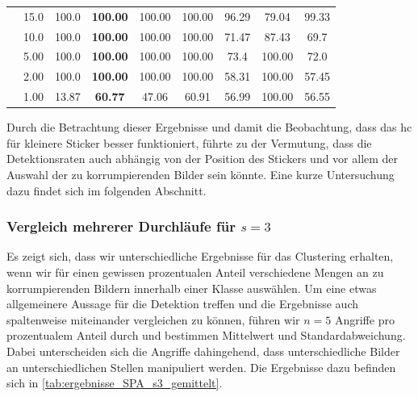 \documentclass[twoside, 12pt,a4paper]{book}
\numberwithin{equation}{section}
\begin{document}
\begin{table}[ht!]
\begin{center}
{\begin{tabular}{|l|c|c|ccc|ccc|}
				& 15.0			& 100.0		& \textbf{100.00}& 100.00	& 100.00& 96.29	& 79.04	& 99.33	 \\
				& 10.0			& 100.0		& \textbf{100.00}& 100.00	& 100.00& 71.47	& 87.43 & 69.7 	 \\
				& 5.00			& 100.0		& \textbf{100.00}& 100.00	& 100.00& 73.4	& 100.00& 72.0	\\
				& 2.00			& 100.0		& \textbf{100.00}& 100.00	& 100.00& 58.31 & 100.00& 57.45		\\
				& 1.00			& 13.87		& \textbf{60.77 }& 47.06		& 60.91	& 56.99	& 100.00& 56.55 \\ \hline
		\end{tabular}}
	\end{center}
	
\end{table}
	\noindent Durch die Betrachtung dieser Ergebnisse und damit die Beobachtung, dass das \ac{hc} für kleinere Sticker besser funktioniert, führte zu der Vermutung, dass die Detektionsraten auch abhängig von der Position des Stickers und vor allem der Auswahl der zu korrumpierenden Bilder sein könnte. Eine kurze Untersuchung dazu findet sich im folgenden Abschnitt.


	\subsubsection{Vergleich mehrerer Durchläufe für $s=3$}
	Es zeigt sich, dass wir unterschiedliche Ergebnisse für das Clustering erhalten, wenn wir für einen gewissen prozentualen Anteil verschiedene Mengen an zu korrumpierenden Bildern innerhalb einer Klasse auswählen. Um eine etwas allgemeinere Aussage für die Detektion treffen und die Ergebnisse auch spaltenweise miteinander vergleichen zu können, führen wir $n=5$ Angriffe pro prozentualem Anteil durch und bestimmen Mittelwert und Standardabweichung. Dabei unterscheiden sich die Angriffe dahingehend, dass unterschiedliche Bilder an unterschiedlichen Stellen manipuliert werden.
	Die Ergebnisse dazu befinden sich in \autoref{tab:ergebnisse_SPA_s3_gemittelt}.
	
\end{document}
